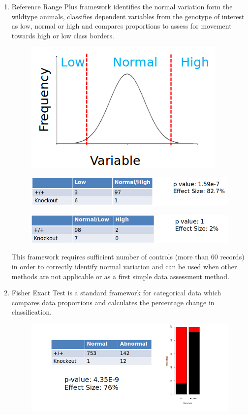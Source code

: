 \documentclass[12pt,a4paper]{article}
\begin{document}
\begin{enumerate}
\item Reference Range Plus framework identifies the normal variation form the wildtype animals, classifies dependent variables from the genotype of interest as low, normal or high and compares proportions to assess for movement towards high or low class borders.  
\begin{figure}[H]%
\centerline{\includegraphics[scale=0.4]{RR1_simple.png}}
\end{figure} 
\begin{figure}[H]%
\centerline{\includegraphics[scale=0.4]{RR2_1_simple.png}}
\end{figure}
\begin{figure}[H]%
\centerline{\includegraphics[scale=0.4]{RR2_2_simple.png}}
\end{figure}

This framework requires sufficient number of controls (more than 60 records) in order to correctly identify normal variation and can be used when other methods are not applicable or as a first simple data assessment method. 
\item Fisher Exact Test is a standard framework for categorical data which compares data proportions and calculates the percentage change in classification.
\begin{figure}[H]%
\centerline{\includegraphics[scale=0.4]{FE_simple.png}}
\end{figure}


\end{enumerate}
\end{document}

